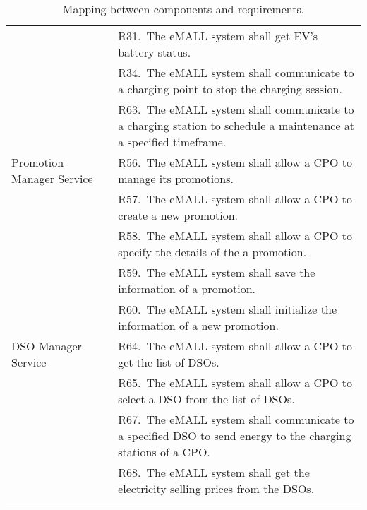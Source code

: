 \begin{center}
\begin{longtable}{p{0.3\linewidth}p{0.7\linewidth}}
        & R31.\ The eMALL system shall get EV’s battery status.                                                                                           \\
        & R34.\ The eMALL system shall communicate to a charging point to stop the charging session.                                                      \\
        & R63.\ The eMALL system shall communicate to a charging station to schedule a maintenance at a specified timeframe.                              \\
        \hline
        Promotion Manager Service              & R56.\ The eMALL system shall allow a CPO to manage its promotions.                                                                              \\
        & R57.\ The eMALL system shall allow a CPO to create a new promotion.                                                                             \\
        & R58.\ The eMALL system shall allow a CPO to specify the details of the a promotion.                                                             \\
        & R59.\ The eMALL system shall save the information of a promotion.                                                                               \\
        & R60.\ The eMALL system shall initialize the information of a new promotion.                                                                     \\
        \hline
        DSO Manager Service                    & R64.\ The eMALL system shall allow a CPO to get the list of DSOs.                                                                               \\
        & R65.\ The eMALL system shall allow a CPO to select a DSO from the list of DSOs.                                                                 \\
        & R67.\ The eMALL system shall communicate to a specified DSO to send energy to the charging stations of a CPO.                                   \\
        & R68.\ The eMALL system shall get the electricity selling prices from the DSOs.                                                                  \\
        \hline
        \caption{Mapping between components and requirements.}
        \label{tab: map_comp_req}%
    \end{longtable}
\end{center}

